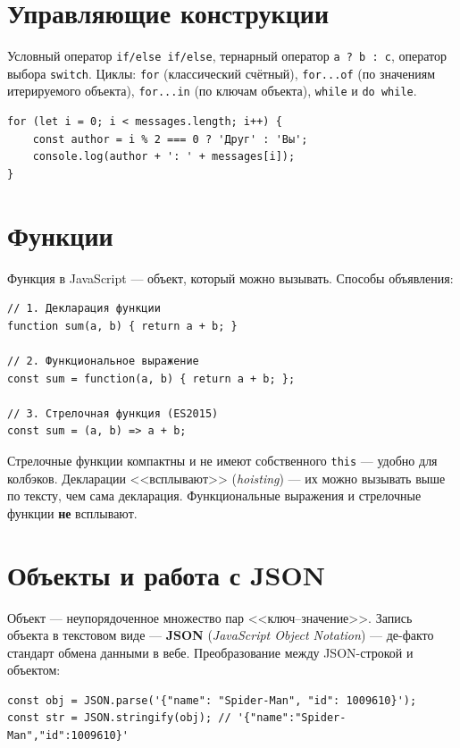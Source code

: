\section{Управляющие конструкции}

Условный оператор \texttt{if/else~if/else}, тернарный оператор
\texttt{a~?~b~:~c}, оператор выбора \texttt{switch}. Циклы:
\texttt{for} (классический счётный), \texttt{for...of} (по значениям
итерируемого объекта), \texttt{for...in} (по ключам объекта),
\texttt{while} и \texttt{do~while}.

\begin{lstlisting}[caption={Цикл с условным выбором имени отправителя},captionpos=b]
for (let i = 0; i < messages.length; i++) {
    const author = i % 2 === 0 ? 'Друг' : 'Вы';
    console.log(author + ': ' + messages[i]);
}
\end{lstlisting}

\section{Функции}

Функция в JavaScript --- объект, который можно вызывать. Способы
объявления:

\begin{lstlisting}[caption={Три способа объявить функцию},captionpos=b]
// 1. Декларация функции
function sum(a, b) { return a + b; }

// 2. Функциональное выражение
const sum = function(a, b) { return a + b; };

// 3. Стрелочная функция (ES2015)
const sum = (a, b) => a + b;
\end{lstlisting}

Стрелочные функции компактны и не имеют собственного \texttt{this} ---
удобно для колбэков. Декларации <<всплывают>> (\textit{hoisting}) ---
их можно вызывать выше по тексту, чем сама декларация. Функциональные
выражения и стрелочные функции \textbf{не} всплывают.

\section{Объекты и работа с JSON}

Объект --- неупорядоченное множество пар <<ключ--значение>>. Запись
объекта в текстовом виде --- \textbf{JSON} (\textit{JavaScript Object
Notation}) --- де-факто стандарт обмена данными в вебе. Преобразование
между JSON-строкой и объектом:

\begin{lstlisting}[caption={\texttt{JSON.parse} и \texttt{JSON.stringify}},captionpos=b]
const obj = JSON.parse('{"name": "Spider-Man", "id": 1009610}');
const str = JSON.stringify(obj); // '{"name":"Spider-Man","id":1009610}'
\end{lstlisting}

